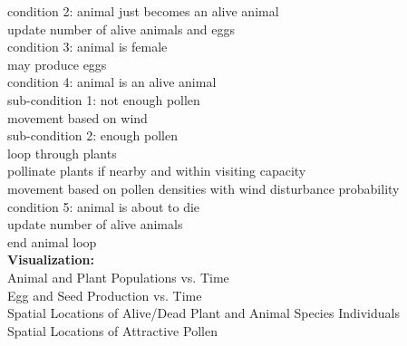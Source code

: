 \documentclass[3p,,preprint,12pt]{elsarticle}
\begin{document}
    \indent \indent \indent condition 2: animal just becomes an alive animal \\
    \indent \indent \indent \indent update number of alive animals and eggs \\
    \indent \indent \indent condition 3: animal is female \\
    \indent \indent \indent \indent may produce eggs \\
    \indent \indent \indent condition 4: animal is an alive animal \\
    \indent \indent \indent \indent sub-condition 1: not enough pollen\\
    \indent \indent \indent \indent \indent movement based on wind\\
    \indent \indent \indent \indent sub-condition 2: enough pollen\\
    \indent \indent \indent \indent loop through plants \\
    \indent \indent \indent \indent \indent pollinate plants if nearby and within visiting capacity \\
    \indent \indent \indent \indent \indent movement based on pollen densities with wind disturbance probability\\
    \indent \indent \indent condition 5: animal is about to die \\
    \indent \indent \indent \indent update number of alive animals \\
    \indent \indent end animal loop \\
    
\noindent \textbf{Visualization:}\\ 
    \indent Animal and Plant Populations vs. Time\\
    \indent Egg and Seed Production vs. Time\\
    \indent Spatial Locations of Alive/Dead Plant and Animal Species Individuals\\
    \indent Spatial Locations of Attractive Pollen\\\
\end{document}
